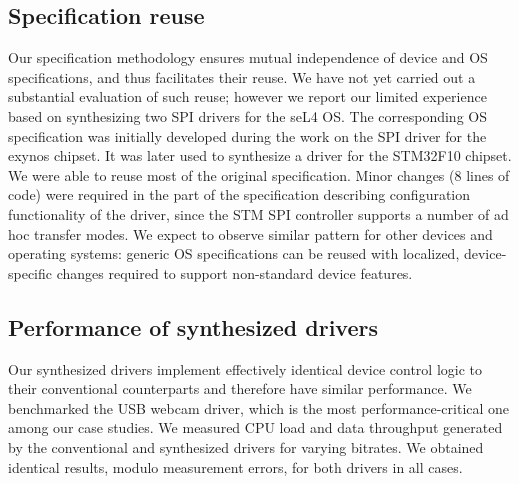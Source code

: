 \subsection{Specification reuse}  
Our specification methodology ensures mutual independence of device and OS specifications, and thus facilitates their reuse.  We have not yet carried out a substantial evaluation of such reuse; however we report our limited experience based on synthesizing two SPI drivers for the seL4 OS.  The corresponding OS specification was initially developed during the work on the SPI driver for the exynos chipset.  It was later used to synthesize a driver for the STM32F10 chipset.  We were able to reuse most of the original specification.  Minor changes (8 lines of code) were required in the part of the specification describing configuration functionality of the driver, since the STM SPI controller supports a number of ad hoc transfer modes.  We expect to observe similar pattern for other devices and operating systems: generic OS specifications can be reused with localized, device-specific changes required to support non-standard device features.

\subsection{Performance of synthesized drivers} 
Our synthesized drivers implement effectively identical device control logic to their conventional counterparts and therefore have similar performance.  We benchmarked the USB webcam driver, which is the most performance-critical one among our case studies.  We measured CPU load and data throughput generated by the conventional and synthesized drivers for varying bitrates.  We obtained identical results, modulo measurement errors, for both drivers in all cases.

